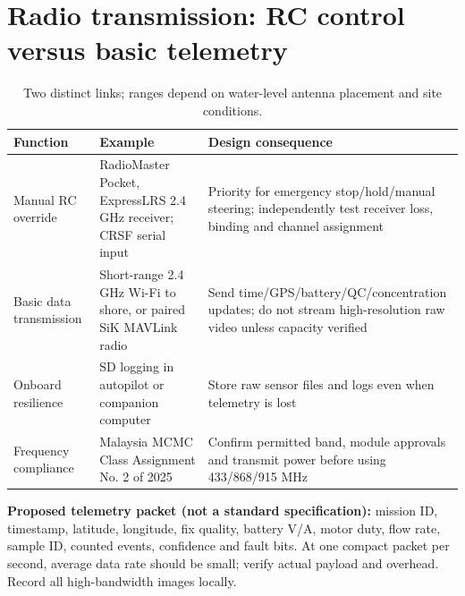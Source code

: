 \documentclass[10pt,a4paper]{article}
\begin{document}
\section{Radio transmission: RC control versus basic telemetry}
\begin{table}[H]\centering\footnotesize
\caption{Two distinct links; ranges depend on water-level antenna placement and site conditions.}
\begin{tabularx}{\linewidth}{@{}L{2.7cm}L{3.1cm}Y@{}}\toprule
Function & Example & Design consequence\\\midrule
Manual RC override & RadioMaster Pocket, ExpressLRS 2.4 GHz receiver; CRSF serial input & Priority for emergency stop/hold/manual steering; independently test receiver loss, binding and channel assignment \cite{RadioMaster}\\
Basic data transmission & Short-range 2.4 GHz Wi-Fi to shore, or paired SiK MAVLink radio & Send time/GPS/battery/QC/concentration updates; do not stream high-resolution raw video unless capacity verified \cite{SiK}\\
Onboard resilience & SD logging in autopilot or companion computer & Store raw sensor files and logs even when telemetry is lost\\
Frequency compliance & Malaysia MCMC Class Assignment No. 2 of 2025 & Confirm permitted band, module approvals and transmit power before using 433/868/915 MHz \cite{MCMC}\\\bottomrule\end{tabularx}\end{table}
\textbf{Proposed telemetry packet (not a standard specification):} mission ID, timestamp, latitude, longitude, fix quality, battery V/A, motor duty, flow rate, sample ID, counted events, confidence and fault bits. At one compact packet per second, average data rate should be small; verify actual payload and overhead. Record all high-bandwidth images locally.
\end{document}
